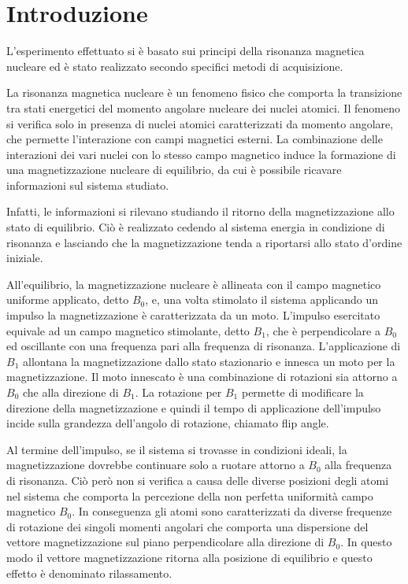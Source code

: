 \section*{Introduzione}
L'esperimento effettuato si è basato sui principi della risonanza magnetica nucleare ed è stato realizzato secondo specifici metodi di acquisizione. 

La risonanza magnetica nucleare è un fenomeno fisico che comporta la transizione tra stati energetici del momento angolare nucleare dei nuclei atomici.
Il fenomeno si verifica solo in presenza di nuclei atomici caratterizzati da momento angolare, che permette l'interazione con campi magnetici esterni.
La combinazione delle interazioni dei vari nuclei con lo stesso campo magnetico induce la formazione di una magnetizzazione nucleare di equilibrio, da cui è possibile ricavare informazioni sul sistema studiato.

Infatti, le informazioni si rilevano studiando il ritorno della magnetizzazione allo stato di equilibrio.
Ciò è realizzato cedendo al sistema energia in condizione di risonanza e lasciando che la magnetizzazione tenda a riportarsi allo stato d'ordine iniziale. 

All'equilibrio, la magnetizzazione nucleare è allineata con il campo magnetico uniforme applicato, detto $B_0$, e, una volta stimolato il sistema applicando un impulso la magnetizzazione è caratterizzata da un moto.
L'impulso esercitato equivale ad un campo magnetico stimolante, detto $B_1$, che è perpendicolare a $B_0$ ed oscillante con una frequenza pari alla frequenza di risonanza. 
L'applicazione di $B_1$ allontana la magnetizzazione dallo stato stazionario e innesca un moto per la magnetizzazione.
Il moto innescato è una combinazione di rotazioni sia attorno a $B_0$ che alla direzione di $B_1$.
La rotazione per $B_1$ permette di modificare la direzione della magnetizzazione e quindi il tempo di applicazione dell'impulso incide sulla grandezza dell'angolo di rotazione, chiamato flip angle.

Al termine dell'impulso, se il sistema si trovasse in condizioni ideali, la magnetizzazione dovrebbe continuare solo a ruotare attorno a $B_0$ alla frequenza di risonanza. 
Ciò però non si verifica a causa delle diverse posizioni degli atomi nel sistema che comporta la percezione della non perfetta uniformità campo magnetico $B_0$. 
In conseguenza gli atomi sono caratterizzati da diverse frequenze di rotazione dei singoli momenti angolari che comporta una dispersione del vettore magnetizzazione sul piano perpendicolare alla direzione di $B_0$.
In questo modo il vettore magnetizzazione ritorna alla posizione di equilibrio e questo effetto è denominato rilassamento.


